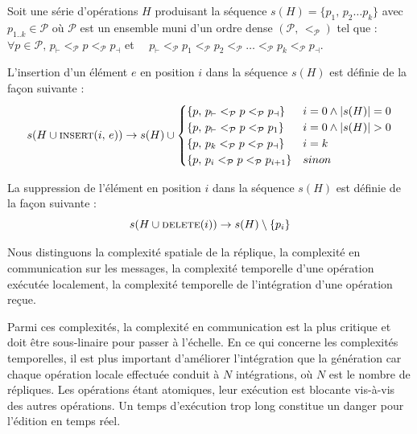 \begin{definition}
  Soit une série d'opérations $H$ produisant la séquence
  $s(H) = \{p_1,\, p_2 \ldots p_k\}$ avec $p_{1..k} \in \mathcal{P}$ où
  $\mathcal{P}$ est un ensemble muni d'un ordre
  dense $(\mathcal{P},\,<_\mathcal{P})$ tel que : \\
  $\forall p\in\mathcal{P},\, p_\vdash <_\mathcal{P} p <_\mathcal{P} p_\dashv $
  \hfill et \ \
  $p_\vdash <_\mathcal{P} p_1 <_\mathcal{P} p_2 <_\mathcal{P} \ldots
  <_\mathcal{P} p_k <_\mathcal{P} p_\dashv$.
  
  \noindent L'insertion d'un élément $e$ en position $i$ dans la séquence $s(H)$
  est définie de la façon suivante :
  \begin{equation}
    s(H \cup \textsc{insert}(i,\, e)) \rightarrow s(H) \cup 
    \begin{cases}
      \{p,\, p_\vdash <_\mathcal{P} p <_\mathcal{P} p_\dashv \} & i = 0 \wedge |s(H)| = 0\\
      \{p,\, p_\vdash <_\mathcal{P} p <_\mathcal{P} p_1 \} & i = 0 \wedge |s(H)|>0\\
      \{p,\, p_k <_\mathcal{P} p <_\mathcal{P} p_\dashv \} & i = k\\
      \{p,\, p_i <_\mathcal{P} p <_\mathcal{P} p_{i+1} \} & sinon
    \end{cases}
  \end{equation}

  \noindent La suppression de l'élément en position $i$ dans la séquence $s(H)$
  est définie de la façon suivante :
  \begin{equation}
    s(H \cup \textsc{delete}(i)) \rightarrow s(H) \setminus \{ p_i \}
  \end{equation}
\end{definition}


Nous distinguons la complexité spatiale de la réplique, la complexité en
communication sur les messages, la complexité temporelle d'une opération
exécutée localement, la complexité temporelle de l'intégration d'une opération
reçue.

\noindent Parmi ces complexités, la complexité en communication est la plus
critique et doit être sous-linaire pour passer à l'échelle. En ce qui concerne
les complexités temporelles, il est plus important d'améliorer l'intégration que
la génération car chaque opération locale effectuée conduit à $N$ intégrations,
où $N$ est le nombre de répliques.  Les opérations étant atomiques, leur
exécution est blocante vis-à-vis des autres opérations. Un temps d'exécution
trop long constitue un danger pour l'édition en temps réel.

